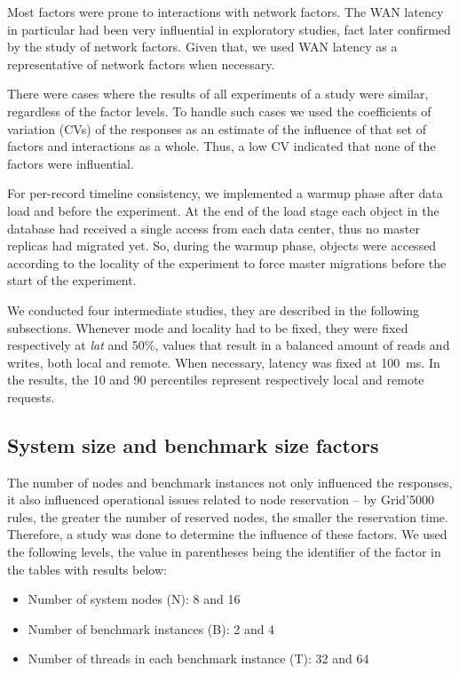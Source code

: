 \documentclass[doublespacing]{bmcart}
\begin{document}
Most factors were prone to interactions with network factors. The WAN latency
in particular had been very influential in exploratory studies, fact later
confirmed by the study of network factors. Given that, we used WAN latency as a
representative of network factors when necessary.

There were cases where the results of all experiments of a study were similar,
regardless of the factor levels. To handle such cases we used the coefficients
of variation (CVs) of the responses as an estimate of the influence of that set
of factors and interactions as a whole. Thus, a low CV indicated that none of
the factors were influential.

For per-record timeline consistency, we implemented a warmup phase after data
load and before the experiment. At the end of the load stage each object in the
database had received a single access from each data center, thus no master
replicas had migrated yet. So, during the warmup phase, objects were accessed
according to the locality of the experiment to force master migrations before
the start of the experiment.

We conducted four intermediate studies, they are described in the following
subsections. Whenever mode and locality had to be fixed, they were fixed
respectively at \textit{lat} and 50\%, values that result in a balanced amount
of reads and writes, both local and remote. When necessary, latency was fixed
at 100~ms. In the results, the 10 and 90 percentiles represent respectively
local and remote requests.

\subsection{System size and benchmark size factors}

The number of nodes and benchmark instances not only influenced the
responses, it also influenced operational issues related to node reservation --
by Grid'5000 rules, the greater the number of reserved nodes, the smaller the
reservation time. Therefore, a study was done to determine the influence of
these factors. We used the following levels, the value in parentheses
being the identifier of the factor in the tables with results below:

\begin{itemize}

\item Number of system nodes (N): 8 and 16

\item Number of benchmark instances (B): 2 and 4

\item Number of threads in each benchmark instance (T): 32 and 64

\end{itemize}
\end{document}
